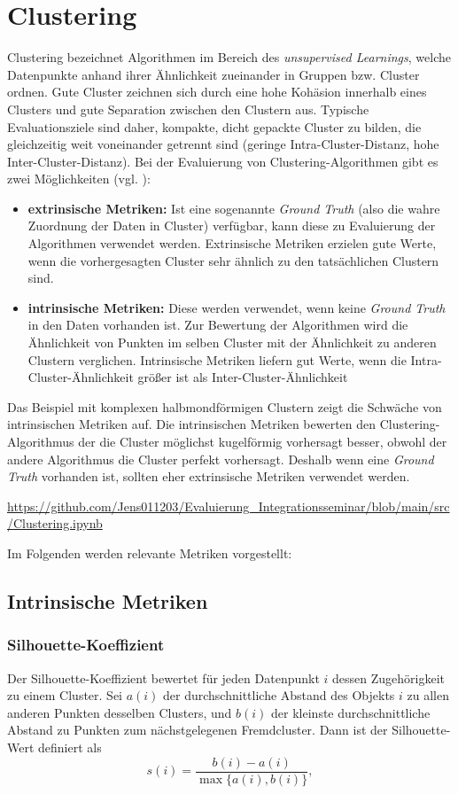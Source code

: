\chapter{Clustering}
Clustering bezeichnet Algorithmen im Bereich des \emph{unsupervised Learnings},
welche Datenpunkte anhand ihrer Ähnlichkeit zueinander in Gruppen bzw. Cluster
ordnen.
Gute Cluster zeichnen sich durch eine hohe Kohäsion innerhalb
eines Clusters und gute Separation zwischen den Clustern aus. Typische
Evaluationsziele sind daher, kompakte, dicht gepackte Cluster zu bilden, die
gleichzeitig weit voneinander getrennt sind (geringe Intra-Cluster-Distanz,
hohe Inter-Cluster-Distanz). 
Bei der Evaluierung von Clustering-Algorithmen gibt es zwei Möglichkeiten (vgl. \cite{Miller2024}):
\begin{itemize}
 \item \textbf{extrinsische Metriken:} Ist eine sogenannte \textit{Ground Truth} (also die wahre Zuordnung der Daten in Cluster) verfügbar, kann diese zu Evaluierung
    der Algorithmen verwendet werden. Extrinsische Metriken erzielen gute Werte, wenn die vorhergesagten Cluster sehr ähnlich zu den tatsächlichen Clustern sind.
 \item \textbf{intrinsische Metriken:} Diese werden verwendet, wenn keine \textit{Ground Truth} in den Daten vorhanden ist. Zur Bewertung der Algorithmen wird 
    die Ähnlichkeit von Punkten im selben Cluster mit der Ähnlichkeit zu anderen Clustern verglichen. Intrinsische Metriken liefern gut Werte, wenn die 
    Intra-Cluster-Ähnlichkeit größer ist als Inter-Cluster-Ähnlichkeit
\end{itemize}
Das Beispiel mit komplexen 
halbmondförmigen Clustern zeigt die Schwäche von intrinsischen Metriken auf. Die intrinsischen Metriken bewerten den Clustering-Algorithmus
der die Cluster möglichst kugelförmig vorhersagt besser, obwohl der andere Algorithmus die Cluster perfekt vorhersagt. Deshalb wenn eine 
\emph{Ground Truth} vorhanden ist, sollten eher extrinsische Metriken verwendet werden.

\url{https://github.com/Jens011203/Evaluierung_Integrationsseminar/blob/main/src/Clustering.ipynb}

Im Folgenden werden relevante Metriken vorgestellt:

\section{Intrinsische Metriken}
\subsection{Silhouette-Koeffizient} Der Silhouette-Koeffizient bewertet für jeden
Datenpunkt $i$ dessen Zugehörigkeit zu einem Cluster. Sei $a(i)$ der
durchschnittliche Abstand des Objekts $i$ zu allen anderen Punkten desselben
Clusters, und $b(i)$ der kleinste durchschnittliche Abstand zu Punkten zum nächstgelegenen Fremdcluster.
Dann ist der Silhouette-Wert definiert als 
\[ s(i) =
\frac{b(i) - a(i)}{\max\{a(i),b(i)\}}, \] 

